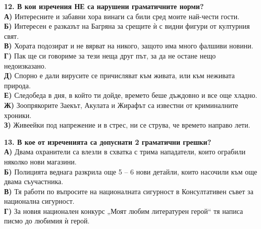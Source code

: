 \documentclass[12pt,a4paper]{article}
\begin{document}
\vspace{0.6cm}

\noindent
\textbf{12. В кои изречения НЕ са нарушени граматичните норми?} \\
\textbf{А)} Интересните и забавни хора винаги са били сред моите най-чести гости. \\
\textbf{Б)} Интересен е разказът на Багряна за срещите ѝ с видни фигури от културния свят. \\
\textbf{В)} Хората подозират и не вярват на никого, защото има много фалшиви новини. \\
\textbf{Г)} Пак ще си говориме за тези неща друг път, за да не остане нещо недоизказано. \\
\textbf{Д)} Спорно е дали вирусите се причисляват към живата, или към неживата природа. \\
\textbf{Е)} Следобеда в дня, в който ти дойде, времето беше дъждовно и все още хладно. \\
\textbf{Ж)} Зоопрякорите Заекът, Акулата и Жирафът са известни от криминалните хроники. \\
\textbf{З)} Живеейки под напрежение и в стрес, ни се струва, че времето направо лети.  

\vspace{0.6cm}

\noindent
\textbf{13. В кое от изреченията са допуснати 2 граматични грешки?} \\
\textbf{А)} Двама охранители са влезли в схватка с трима нападатели, които ограбили няколко нови магазини. \\
\textbf{Б)} Полицията веднага разкрила още 5 – 6 нови детайли, които насочили към още двама съучастника. \\
\textbf{В)} Тя работи по въпросите на националната сигурност в Консултативен съвет за национална сигурност. \\
\textbf{Г)} За новия национален конкурс „Моят любим литературен герой“ тя написа писмо до любимия ѝ герой.

\vspace{0.6cm}
\end{document}
